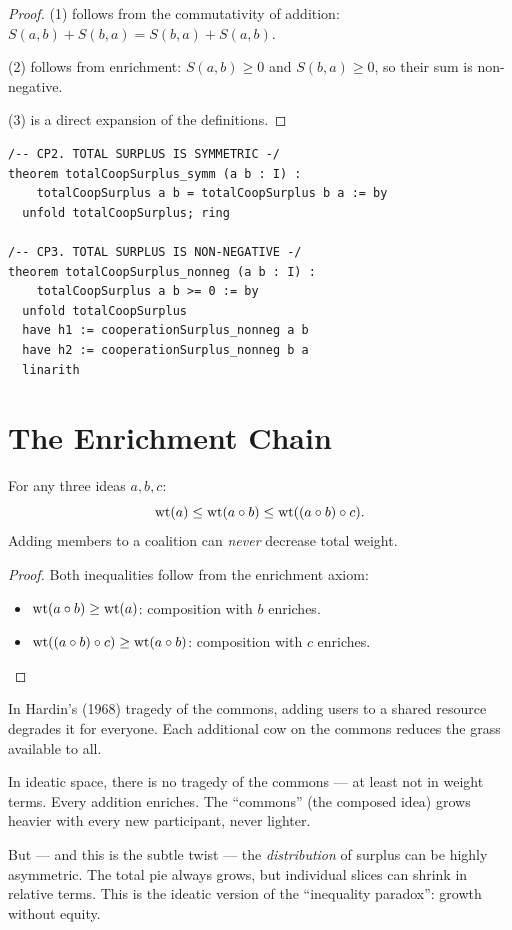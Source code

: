 \begin{proof}
(1) follows from the commutativity of addition: $S(a,b) + S(b,a) = S(b,a) + S(a,b)$.

(2) follows from enrichment: $S(a,b) \geq 0$ and $S(b,a) \geq 0$, so their sum is non-negative.

(3) is a direct expansion of the definitions.
\end{proof}

\begin{lstlisting}
/-- CP2. TOTAL SURPLUS IS SYMMETRIC -/
theorem totalCoopSurplus_symm (a b : I) :
    totalCoopSurplus a b = totalCoopSurplus b a := by
  unfold totalCoopSurplus; ring

/-- CP3. TOTAL SURPLUS IS NON-NEGATIVE -/
theorem totalCoopSurplus_nonneg (a b : I) :
    totalCoopSurplus a b >= 0 := by
  unfold totalCoopSurplus
  have h1 := cooperationSurplus_nonneg a b
  have h2 := cooperationSurplus_nonneg b a
  linarith
\end{lstlisting}

\section{The Enrichment Chain}

\begin{theorem}
\label{thm:enrichment-chain}
For any three ideas $a, b, c$:
\[
\operatorname{wt}(a) \leq \operatorname{wt}(a \circ b) \leq \operatorname{wt}((a \circ b) \circ c).
\]
Adding members to a coalition can \emph{never} decrease total weight.
\end{theorem}

\begin{proof}
Both inequalities follow from the enrichment axiom:
\begin{itemize}
\item $\operatorname{wt}(a \circ b) \geq \operatorname{wt}(a)$: composition with $b$ enriches.
\item $\operatorname{wt}((a \circ b) \circ c) \geq \operatorname{wt}(a \circ b)$: composition with $c$ enriches.
\end{itemize}
\end{proof}

\begin{paradox}
In Hardin's (1968) tragedy of the commons, adding users to a shared resource degrades it for everyone. Each additional cow on the commons reduces the grass available to all.

In ideatic space, there is no tragedy of the commons --- at least not in weight terms. Every addition enriches. The ``commons'' (the composed idea) grows heavier with every new participant, never lighter.

But --- and this is the subtle twist --- the \emph{distribution} of surplus can be highly asymmetric. The total pie always grows, but individual slices can shrink in relative terms. This is the ideatic version of the ``inequality paradox'': growth without equity.
\end{paradox}

